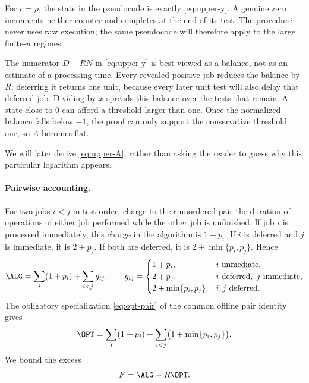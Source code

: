 For $c=\rho$, the state in the pseudocode is exactly
\eqref{eq:upper-y}.  A genuine zero increments neither counter and completes
at the end of its test.  The procedure never uses raw execution; the same
pseudocode will therefore apply to the large finite-$u$ regimes.

The numerator $D-RN$ in \eqref{eq:upper-y} is best viewed as a balance,
not as an estimate of a processing time.  Every revealed positive job reduces
the balance by $R$; deferring it returns one unit, because every later unit
test will also delay that deferred job.  Dividing by $x$ spreads this balance
over the tests that remain.  A state close to $0$ can afford a threshold
larger than one.  Once the normalized balance falls below $-1$, the proof can
only support the conservative threshold one, so $A$ becomes flat.

We will later derive \eqref{eq:upper-A}, rather than asking the reader to
guess why this particular logarithm appears.

\paragraph{Pairwise accounting.}
For two jobs $i<j$ in test order, charge to their unordered pair the duration
of operations of either job performed while the other job is unfinished.  If
job $i$ is processed immediately, this charge in the algorithm is $1+p_i$.
If $i$ is deferred and $j$ is immediate, it is $2+p_j$.  If both are
deferred, it is $2+\min\{p_i,p_j\}$.  Hence
\begin{equation}
\label{eq:upper-alg-pair}
 \ALG=\sum_i(1+p_i)+\sum_{i<j}g_{ij},
 \qquad
 g_{ij}=
 \begin{cases}
  1+p_i, & i\text{ immediate},\\
  2+p_j, & i\text{ deferred},\ j\text{ immediate},\\
  2+\min\{p_i,p_j\}, & i,j\text{ deferred}.
 \end{cases}
\end{equation}
The obligatory specialization \cref{eq:opt-pair} of the common offline pair
identity gives
\begin{equation}
\label{eq:upper-opt-pair}
 \OPT=\sum_i(1+p_i)
       +\sum_{i<j}\bigl(1+\min\{p_i,p_j\}\bigr).
\end{equation}
We bound the excess
\[
 F=\ALG-R\OPT.
\]

